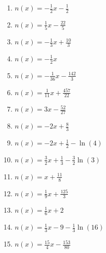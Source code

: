 \begin{Answer}[ref=normaleBestimmenA1]

	\begin{enumerate}[label=\alph*)]
		\item \(n(x)=-\frac{1}{2}x-\frac{1}{2}\)
		\item \(n(x)=\frac{1}{5}x-\frac{22}{5}\)
		\item \(n(x)=-\frac{1}{3}x+\frac{10}{3}\)
		\item \(n(x)=-\frac{1}{2}x\)
		\item \(n(x)=-\frac{1}{36}x-\frac{142}{3}\)
		\item \(n(x)=\frac{1}{11}x+\frac{457}{22}\)
		\item \(n(x)=3x-\frac{52}{27}\)
		\item \(n(x)=-2x+\frac{8}{3}\)
		\item \(n(x)=-2x+\frac{1}{2}-\ln(4)\)
		\item \(n(x)=\frac{3}{2}x+\frac{1}{3}-\frac{3}{2}\ln(3)\)
		\item \(n(x)=x+\frac{11}{8}\)
		\item \(n(x)=\frac{1}{9}x+\frac{125}{3}\)
		\item \(n(x)=\frac{1}{6}x+2\)
		\item \(n(x)=\frac{1}{3}x-9-\frac{1}{3}\ln(16)\)
		\item \(n(x)=\frac{15}{4}x-\frac{153}{80}\)
	\end{enumerate}
\end{Answer}
